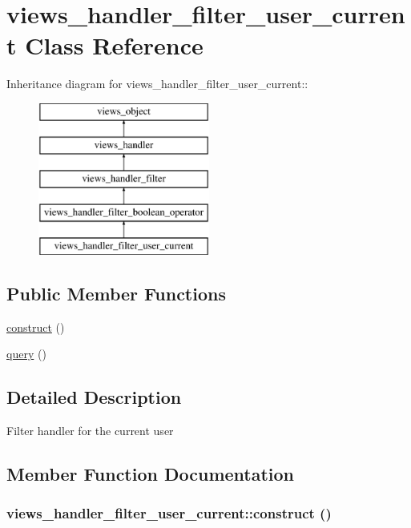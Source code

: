 \hypertarget{classviews__handler__filter__user__current}{
\section{views\_\-handler\_\-filter\_\-user\_\-current Class Reference}
\label{classviews__handler__filter__user__current}
}
Inheritance diagram for views\_\-handler\_\-filter\_\-user\_\-current::\begin{figure}[H]
\begin{center}
\leavevmode
\includegraphics[height=5cm]{classviews__handler__filter__user__current}
\end{center}
\end{figure}
\subsection*{Public Member Functions}
\begin{CompactItemize}
\item 
\hyperlink{classviews__handler__filter__user__current_2e747ed7a374f3c16abd60b5065520a9}{construct} ()
\item 
\hyperlink{classviews__handler__filter__user__current_6002cf25d2385bd07c771f9a65cee48f}{query} ()
\end{CompactItemize}


\subsection{Detailed Description}
Filter handler for the current user 

\subsection{Member Function Documentation}
\hypertarget{classviews__handler__filter__user__current_2e747ed7a374f3c16abd60b5065520a9}{
\subsubsection[{construct}]{\setlength{\rightskip}{0pt plus 5cm}views\_\-handler\_\-filter\_\-user\_\-current::construct ()}}
\label{classviews__handler__filter__user__current_2e747ed7a374f3c16abd60b5065520a9}


